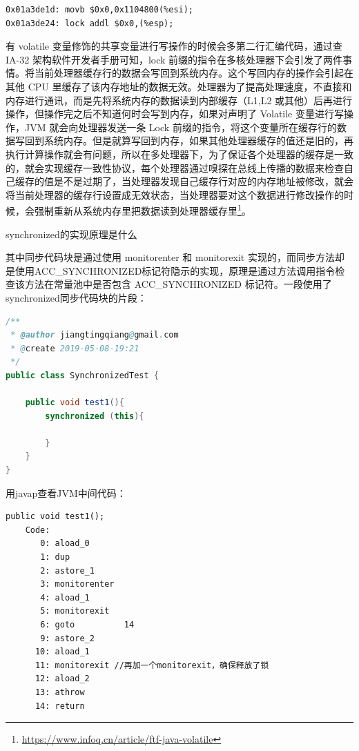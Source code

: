 \documentclass[8pt]{book}
\makeatletter
\numberwithin{dummy}{section}
\theoremstyle{ocrenumbox}
\theoremstyle{blacknumex}
\theoremstyle{blacknumbox}
\theoremstyle{ocrenum}
\renewcommand{\subsection}{\@startsection {subsection}{2}{\z@}
	{-3ex \@plus -0.1ex \@minus -.4ex}
	{0.5ex \@plus.2ex }
	{\normalfont\sffamily\bfseries}}
\newlength\esp
\makeatother
\begin{document}
\begin{lstlisting}
0x01a3de1d: movb $0x0,0x1104800(%esi);
0x01a3de24: lock addl $0x0,(%esp);
\end{lstlisting}

有 volatile 变量修饰的共享变量进行写操作的时候会多第二行汇编代码，通过查 IA-32 架构软件开发者手册可知，lock 前缀的指令在多核处理器下会引发了两件事情。将当前处理器缓存行的数据会写回到系统内存。这个写回内存的操作会引起在其他 CPU 里缓存了该内存地址的数据无效。处理器为了提高处理速度，不直接和内存进行通讯，而是先将系统内存的数据读到内部缓存（L1,L2 或其他）后再进行操作，但操作完之后不知道何时会写到内存，如果对声明了 Volatile 变量进行写操作，JVM 就会向处理器发送一条 Lock 前缀的指令，将这个变量所在缓存行的数据写回到系统内存。但是就算写回到内存，如果其他处理器缓存的值还是旧的，再执行计算操作就会有问题，所以在多处理器下，为了保证各个处理器的缓存是一致的，就会实现缓存一致性协议，每个处理器通过嗅探在总线上传播的数据来检查自己缓存的值是不是过期了，当处理器发现自己缓存行对应的内存地址被修改，就会将当前处理器的缓存行设置成无效状态，当处理器要对这个数据进行修改操作的时候，会强制重新从系统内存里把数据读到处理器缓存里\footnote{\url{https://www.infoq.cn/article/ftf-java-volatile}}。

\subsection{synchronized的实现原理是什么}

其中同步代码块是通过使用 monitorenter 和 monitorexit 实现的，而同步方法却是使用ACC\_SYNCHRONIZED标记符隐示的实现，原理是通过方法调用指令检查该方法在常量池中是否包含 ACC\_SYNCHRONIZED 标记符。一段使用了synchronized同步代码块的片段：

\begin{lstlisting}[language=Java]
/**
 * @author jiangtingqiang@gmail.com
 * @create 2019-05-08-19:21
 */
public class SynchronizedTest {

    public void test1(){
        synchronized (this){

        }
    }
}
\end{lstlisting}

用javap查看JVM中间代码：

\begin{lstlisting}
public void test1();
    Code:
       0: aload_0
       1: dup
       2: astore_1
       3: monitorenter
       4: aload_1
       5: monitorexit
       6: goto          14
       9: astore_2
      10: aload_1
      11: monitorexit //再加一个monitorexit，确保释放了锁
      12: aload_2
      13: athrow
      14: return
\end{lstlisting}
\end{document}
